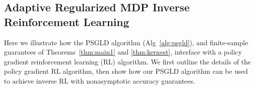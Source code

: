 \documentclass[journal,onecolumn]{IEEEtran}
\begin{document}
\subsection{Adaptive Regularized MDP Inverse Reinforcement Learning}
\label{sec:mdpex}
Here we illustrate how the PSGLD algorithm (Alg~\ref{alg:psgld}), and finite-sample guarantees of Theorems~\ref{thm:main1} and \ref{thm:kernest}, interface with a policy gradient reinforcement learning (RL) algorithm. We first outline the details of the policy gradient RL algorithm, then show how our PSGLD algorithm can be used to achieve inverse RL with nonasymptotic accuracy guarantees. 

\end{document}
